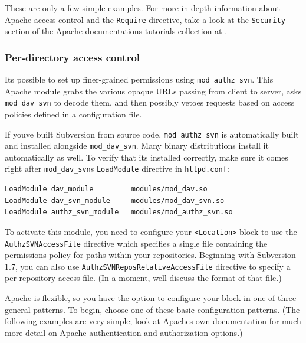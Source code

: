 These are only a few simple examples. For more in-depth information
about Apache access control and the \texttt{Require} directive, take a
look at the \texttt{Security} section of the Apache
documentation\textquotesingle s tutorials collection at
\href{https://httpd.apache.org/docs-2.0/misc/tutorials.html}{}.

\subsubsection{Per-directory access
control}\label{svn.serverconfig.httpd.authz.perdir}

It\textquotesingle s possible to set up finer-grained permissions using
\texttt{mod\_authz\_svn}. This Apache module grabs the various opaque
URLs passing from client to server, asks \texttt{mod\_dav\_svn} to
decode them, and then possibly vetoes requests based on access policies
defined in a configuration file.

If you\textquotesingle ve built Subversion from source code,
\texttt{mod\_authz\_svn} is automatically built and installed alongside
\texttt{mod\_dav\_svn}. Many binary distributions install it
automatically as well. To verify that it\textquotesingle s installed
correctly, make sure it comes right after
\texttt{mod\_dav\_svn}\textquotesingle s \texttt{LoadModule} directive
in \texttt{httpd.conf}:

\begin{verbatim}
LoadModule dav_module         modules/mod_dav.so
LoadModule dav_svn_module     modules/mod_dav_svn.so
LoadModule authz_svn_module   modules/mod_authz_svn.so
\end{verbatim}

To activate this module, you need to configure your
\texttt{\textless{}Location\textgreater{}} block to use the
\texttt{AuthzSVNAccessFile} directive which specifies a single file
containing the permissions policy for paths within your repositories.
Beginning with Subversion 1.7, you can also use
\texttt{AuthzSVNReposRelativeAccessFile} directive to specify a per
repository access file. (In a moment, we\textquotesingle ll discuss the
format of that file.)

Apache is flexible, so you have the option to configure your block in
one of three general patterns. To begin, choose one of these basic
configuration patterns. (The following examples are very simple; look at
Apache\textquotesingle s own documentation for much more detail on
Apache authentication and authorization options.)

